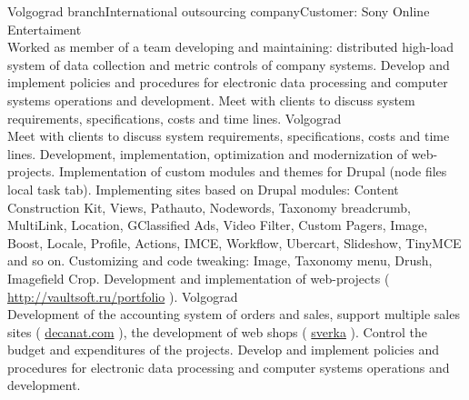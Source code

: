 \documentclass[10pt,a4paper]{moderncv}
\begin{document}
    {Volgograd branch}{International outsourcing company}{Customer: Sony Online Entertaiment\\
			Worked as member of a team developing and maintaining: distributed high-load system of data collection and metric controls of company systems.
			Develop and implement policies and procedures for electronic data processing and computer systems operations and development. 
			Meet with clients to discuss system requirements, specifications, costs and time lines.
		\newline{}
    }
    {Volgograd}{}{\\Meet with clients to discuss system requirements, specifications, costs and time lines. Development, implementation, optimization and modernization of web-projects. Implementation of custom modules and themes for Drupal (node files local task tab). Implementing sites based on Drupal modules: Content Construction Kit, Views, Pathauto, Nodewords, Taxonomy breadcrumb, MultiLink, Location, GClassified Ads, Video Filter, Custom Pagers, Image, Boost, Locale, Profile, Actions, IMCE, Workflow, Ubercart, Slideshow, TinyMCE and so on. Customizing and code tweaking: Image,  Taxonomy menu, Drush, Imagefield Crop. Development and implementation of web-projects (   \url{http://vaultsoft.ru/portfolio}      ).\newline{}
    }
    {Volgograd}{}{\\Development of the accounting system of orders and sales, support multiple sales sites ( \href{http://vaultsoft.ru/portfolio/decanat.com}{decanat.com} ), the development of web shops ( \href{http://vaultsoft.ru/portfolio/sverka}{sverka} ). Control the budget and expenditures of the projects. Develop and implement policies and procedures for electronic data processing and computer systems operations and development.\newline{}
    }
\end{document}
